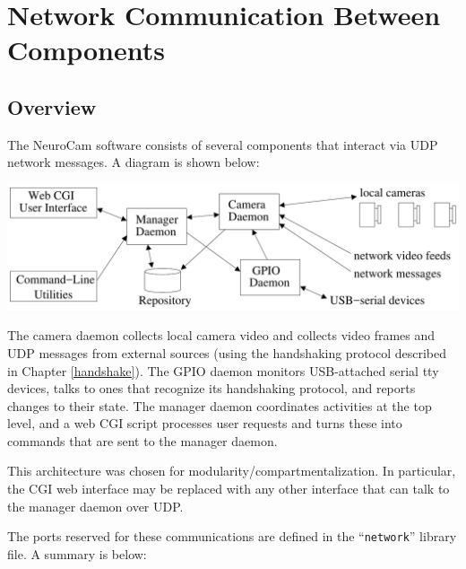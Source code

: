 
\chapter{Network Communication Between Components}
\label{netcomm}

\section{Overview}

The NeuroCam software consists of several components that interact via UDP 
network messages. A diagram is shown below:

\includegraphics[width=0.9\columnwidth]{figs/dev-netcomm.pdf}

The camera daemon collects local camera video and collects video frames and 
UDP messages from external sources (using the handshaking protocol 
described in Chapter \ref{handshake}).
The GPIO daemon monitors USB-attached serial tty devices, talks to ones
that recognize its handshaking protocol, and reports changes to their state.
The manager daemon coordinates activities at the top level, and a web CGI 
script processes user requests and turns these into commands that are sent 
to the manager daemon.

This architecture was chosen for modularity/compartmentalization. In 
particular, the CGI web interface may be replaced with any other interface
that can talk to the manager daemon over UDP.

\clearpage
The ports reserved for these communications are defined in the
``\verb+network+'' library file. A summary is below:

